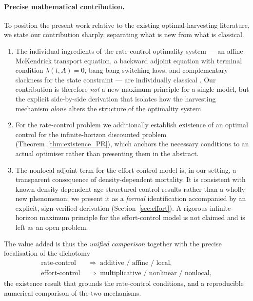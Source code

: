 \documentclass[pdflatex,sn-mathphys-num]{sn-jnl}
\theoremstyle{definition}
\theoremstyle{remark}
\begin{document}
\paragraph{Precise mathematical contribution.}
To position the present work relative to the existing optimal-harvesting
literature, we state our contribution sharply, separating what is new from
what is classical.
\begin{enumerate}[label=(\roman*),leftmargin=2.2em]
\item The individual ingredients of the rate-control optimality system ---
an affine McKendrick transport equation, a backward adjoint equation with
terminal condition $\lambda(t,A)=0$, bang-bang switching laws, and
complementary slackness for the state constraint --- are individually
classical
\citep{brokate_pontryagins_1985,barbu_optimal_1999,anita_analysis_2000,yu2026size}.
Our contribution is therefore \emph{not} a new maximum principle for a single
model, but the explicit side-by-side derivation that isolates how the
harvesting mechanism \emph{alone} alters the structure of the optimality
system.
\item For the rate-control problem we additionally establish existence of an
optimal control for the infinite-horizon discounted problem
(Theorem~\ref{thm:existence_PR}), which anchors the necessary conditions to
an actual optimiser rather than presenting them in the abstract.
\item The nonlocal adjoint term for the effort-control model is, in our
setting, a transparent consequence of density-dependent mortality. It is
consistent with known density-dependent age-structured control results
\citep{boucekkine_optimal_2013} rather than a wholly new phenomenon; we
present it as a \emph{formal} identification accompanied by an explicit,
sign-verified derivation (Section~\ref{sec:effort}). A rigorous
infinite-horizon maximum principle for the effort-control model is not
claimed and is left as an open problem.
\end{enumerate}
The value added is thus the \emph{unified comparison} together with the
precise localisation of the dichotomy
\begin{equation*}
\begin{aligned}
\text{rate-control}\;&\Rightarrow\;\text{additive / affine / local},\\[4pt]
\text{effort-control}\;&\Rightarrow\;\text{multiplicative / nonlinear /
nonlocal},
\end{aligned}
\end{equation*}
the existence result that grounds the rate-control conditions, and a
reproducible numerical comparison of the two mechanisms.
\end{document}
